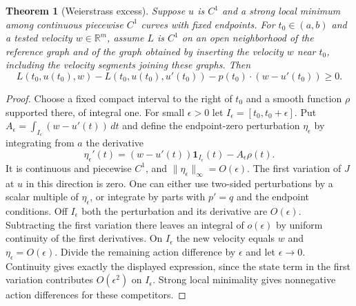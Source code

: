 \documentclass[11pt,oneside,openany]{book}
\theoremstyle{plain}
\newtheorem{theorem}{Theorem}[chapter]
\theoremstyle{definition}
\theoremstyle{remark}
\begin{document}
\begin{theorem}[Weierstrass excess]
\label{thm:v07-07-01}
Suppose \(u\) is \(C^1\) and a strong local minimum among
continuous piecewise \(C^1\) curves with fixed endpoints.
For \(t_0\in(a,b)\) and a tested velocity \(w\in\mathbb R^m\), assume
\(L\) is \(C^1\) on an open neighborhood of the reference graph and
of the graph obtained by inserting the velocity \(w\) near \(t_0\),
including the velocity segments joining these graphs. Then
\[
 L(t_0,u(t_0),w)-L(t_0,u(t_0),u'(t_0))
                  -p(t_0)\cdot(w-u'(t_0))\ge0.
\]
\end{theorem}
\begin{proof}
Choose a fixed compact interval to the right of \(t_0\) and
a smooth function \(\rho\) supported there, of integral one.
For small \(\epsilon>0\) let \(I_\epsilon=[t_0,t_0+\epsilon]\).
Put \(A_\epsilon=\int_{I_\epsilon}(w-u'(t))\,dt\) and define
the endpoint-zero perturbation \(\eta_\epsilon\) by integrating
from \(a\) the derivative
\[
 \eta_\epsilon'(t)=(w-u'(t)){\boldsymbol 1}_{I_\epsilon}(t)
                       -A_\epsilon\rho(t).
\]
It is continuous and piecewise \(C^1\), and
\(\|\eta_\epsilon\|_\infty=O(\epsilon)\).
The first variation of \(J\) at \(u\) in this direction is zero.
One can either use two-sided perturbations by a scalar
multiple of \(\eta_\epsilon\), or integrate by parts with
\(p'=q\) and the endpoint conditions.
Off \(I_\epsilon\) both the perturbation and its derivative
are \(O(\epsilon)\). Subtracting the first variation there
leaves an integral of \(o(\epsilon)\) by uniform continuity
of the first derivatives. On \(I_\epsilon\) the new velocity
equals \(w\) and \(\eta_\epsilon=O(\epsilon)\).
Divide the remaining action difference by \(\epsilon\) and
let \(\epsilon\to0\). Continuity gives exactly the displayed
expression, since the state term in the first variation
contributes \(O(\epsilon^2)\) on \(I_\epsilon\).
Strong local minimality gives nonnegative action differences
for these competitors.
\end{proof}
\end{document}
